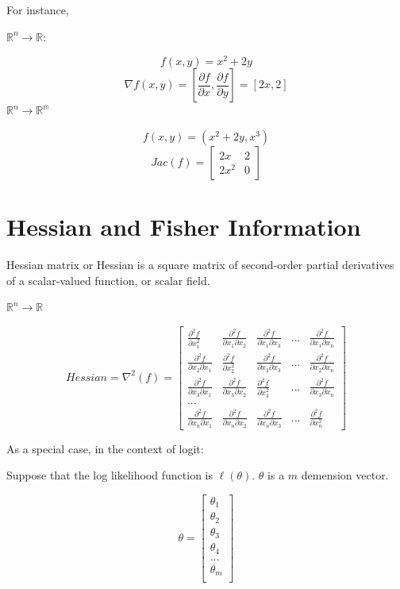 \documentclass[]{book}
\begin{document}
For instance,

\(\mathbb{R}^n \rightarrow \mathbb{R}\):

\[f(x,y)=x^2+2y\]
\[\nabla f(x,y)=[\frac{\partial f}{\partial x},\frac{\partial f}{\partial y}]=[2x,2]\]
\(\mathbb{R}^n \rightarrow \mathbb{R^m}\)

\[f(x,y)=(x^2+2y,x^3)\] \[Jac(f)=\begin{bmatrix}
2x & 2\\
2x^2 & 0 
\end{bmatrix}\]

\section{Hessian and Fisher
Information}\label{hessian-and-fisher-information}

Hessian matrix or Hessian is a square matrix of second-order partial
derivatives of a scalar-valued function, or scalar field.

\(\mathbb{R}^n \rightarrow \mathbb{R}\)

\[Hessian=\nabla ^2(f) =\begin{bmatrix}
\frac{\partial^2 f}{\partial x_1^2} & \frac{\partial^2 f}{\partial x_1 \partial x_2} & \frac{\partial^2 f}{\partial x_1 \partial x_3} & ... & \frac{\partial^2 f}{\partial x_1 \partial x_n}\\
\frac{\partial^2 f}{\partial x_2 \partial x_1} & \frac{\partial^2 f}{\partial x_2^2} & \frac{\partial^2 f}{\partial x_2 \partial x_3} & ... & \frac{\partial^2 f}{\partial x_2 \partial x_n} \\
\frac{\partial^2 f}{\partial x_3 \partial x_1} & \frac{\partial^2 f}{\partial x_3 \partial x_2} & \frac{\partial^2 f}{\partial x_3^2} & ... & \frac{\partial^2 f}{\partial x_3 \partial x_n} \\
...\\
\frac{\partial^2 f}{\partial x_n \partial x_1} & \frac{\partial^2 f}{\partial x_n \partial x_2} & \frac{\partial^2 f}{\partial x_n \partial x_3} & ... & \frac{\partial^2 f}{\partial x_n^2}
\end{bmatrix}\]

As a special case, in the context of logit:

Suppose that the log likelihood function is \(\ell (\theta)\).
\(\theta\) is a \(m\) demension vector.

\[ \theta = \begin{bmatrix}\theta_1 \\
\theta_2 \\
\theta_3 \\
\theta_4 \\
...\\
\theta_m \\
\end{bmatrix}\]
\end{document}
